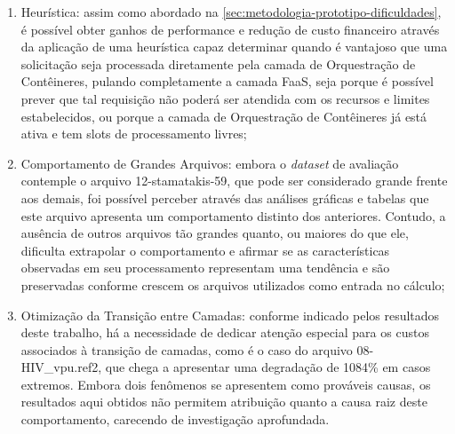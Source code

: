 \documentclass[english,brazilian]{UNISINOSmonografia} %
\begin{document}
\begin{enumerate}[label={\arabic*)}]
	\item Heurística: assim como abordado na \autoref{sec:metodologia-prototipo-dificuldades}, é possível obter ganhos de performance e redução de custo financeiro através da aplicação de uma heurística capaz determinar quando é vantajoso que uma solicitação seja processada diretamente pela camada de Orquestração de Contêineres, pulando completamente a camada FaaS, seja porque é possível prever que tal requisição não poderá ser atendida com os recursos e limites estabelecidos, ou porque a camada de Orquestração de Contêineres já está ativa e tem slots de processamento livres;
	
	\item Comportamento de Grandes Arquivos: embora o \textit{dataset} de avaliação contemple o arquivo 12-stamatakis-59, que pode ser considerado grande frente aos demais, foi possível perceber através das análises gráficas e tabelas que este arquivo apresenta um comportamento distinto dos anteriores.
	Contudo, a ausência de outros arquivos tão grandes quanto, ou maiores do que ele, dificulta extrapolar o comportamento e afirmar se as características observadas em seu processamento representam uma tendência e são preservadas conforme crescem os arquivos utilizados como entrada no cálculo;
	
	\item Otimização da Transição entre Camadas: conforme indicado pelos resultados deste trabalho, há a necessidade de dedicar atenção especial para os custos associados à transição de camadas, como é o caso do arquivo 08-HIV\_vpu.ref2, que chega a apresentar uma degradação de 1084\% em casos extremos.
	Embora dois fenômenos se apresentem como prováveis causas, os resultados aqui obtidos não permitem atribuição quanto a causa raiz deste comportamento, carecendo de investigação aprofundada.

\end{enumerate}
 
%


\end{document}
